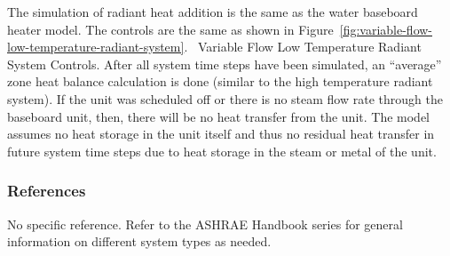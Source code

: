 The simulation of radiant heat addition is the same as the water baseboard heater model. The controls are the same as shown in Figure~\ref{fig:variable-flow-low-temperature-radiant-system}.~ Variable Flow Low Temperature Radiant System Controls. After all system time steps have been simulated, an ``average'' zone heat balance calculation is done (similar to the high temperature radiant system). If the unit was scheduled off or there is no steam flow rate through the baseboard unit, then, there will be no heat transfer from the unit. The model assumes no heat storage in the unit itself and thus no residual heat transfer in future system time steps due to heat storage in the steam or metal of the unit.

\subsubsection{References}\label{references-1-007}

No specific reference. Refer to the ASHRAE Handbook series for general information on different system types as needed.
